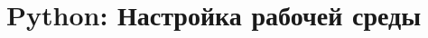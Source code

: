 \documentclass[10pt]{book}
\begin{document}
\chapter{Python: Настройка рабочей среды}




\end{document}
